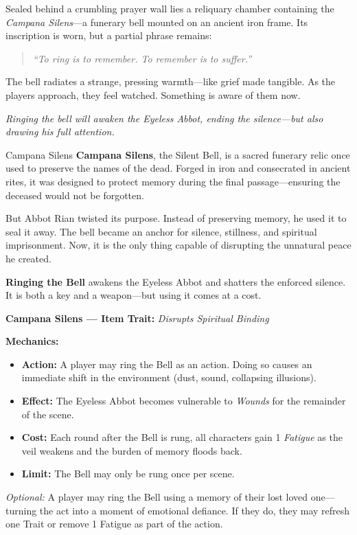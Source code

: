 \documentclass[nodeprecatedcode,bg=print]{dndbook/dndbook}
\begin{document}
Sealed behind a crumbling prayer wall lies a reliquary chamber containing the \emph{Campana Silens}—a funerary bell mounted on an ancient iron frame. Its inscription is worn, but a partial phrase remains:

\begin{quote}
\textit{“To ring is to remember. To remember is to suffer.”}
\end{quote}

The bell radiates a strange, pressing warmth—like grief made tangible. As the players approach, they feel watched. Something is aware of them now.

\emph{Ringing the bell will awaken the Eyeless Abbot, ending the silence—but also drawing his full attention.}


\begin{WyrdSidebar}{Campana Silens}
    \textbf{Campana Silens}, the Silent Bell, is a sacred funerary relic once used to preserve the names of the dead. Forged in iron and consecrated in ancient rites, it was designed to protect memory during the final passage—ensuring the deceased would not be forgotten.
    
    But Abbot Rian twisted its purpose. Instead of preserving memory, he used it to seal it away. The bell became an anchor for silence, stillness, and spiritual imprisonment. Now, it is the only thing capable of disrupting the unnatural peace he created.
    
    \textbf{Ringing the Bell} awakens the Eyeless Abbot and shatters the enforced silence. It is both a key and a weapon—but using it comes at a cost.
    
    \vspace{0.5\baselineskip}
    \textbf{Campana Silens — Item Trait:} \emph{Disrupts Spiritual Binding}
    
    \vspace{0.5\baselineskip}
    \textbf{Mechanics:}
    \begin{itemize}
        \item \textbf{Action:} A player may ring the Bell as an action. Doing so causes an immediate shift in the environment (dust, sound, collapsing illusions).
        \item \textbf{Effect:} The Eyeless Abbot becomes vulnerable to \emph{Wounds} for the remainder of the scene.
        \item \textbf{Cost:} Each round after the Bell is rung, all characters gain 1 \emph{Fatigue} as the veil weakens and the burden of memory floods back.
        \item \textbf{Limit:} The Bell may only be rung once per scene.
    \end{itemize}
    
    \emph{Optional:} A player may ring the Bell using a memory of their lost loved one—turning the act into a moment of emotional defiance. If they do, they may refresh one Trait or remove 1 Fatigue as part of the action.
\end{WyrdSidebar}
\end{document}
